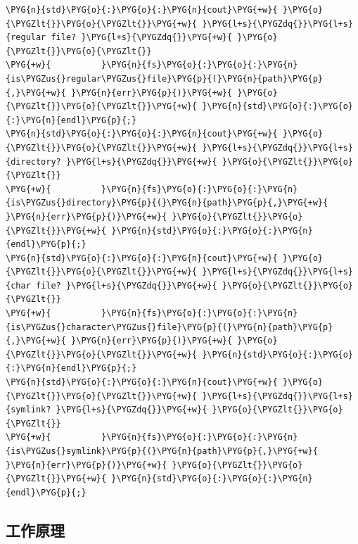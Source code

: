 \begin{itemize}
\begin{codeblockbg}
\begin{Verbatim}[commandchars=\\\{\},breaklines=true,breakanywhere=true,fontsize=\codefont,xleftmargin=17bp]
\PYG{n}{std}\PYG{o}{:}\PYG{o}{:}\PYG{n}{cout}\PYG{+w}{ }\PYG{o}{\PYGZlt{}}\PYG{o}{\PYGZlt{}}\PYG{+w}{ }\PYG{l+s}{\PYGZdq{}}\PYG{l+s}{regular file? }\PYG{l+s}{\PYGZdq{}}\PYG{+w}{ }\PYG{o}{\PYGZlt{}}\PYG{o}{\PYGZlt{}}
\PYG{+w}{          }\PYG{n}{fs}\PYG{o}{:}\PYG{o}{:}\PYG{n}{is\PYGZus{}regular\PYGZus{}file}\PYG{p}{(}\PYG{n}{path}\PYG{p}{,}\PYG{+w}{ }\PYG{n}{err}\PYG{p}{)}\PYG{+w}{ }\PYG{o}{\PYGZlt{}}\PYG{o}{\PYGZlt{}}\PYG{+w}{ }\PYG{n}{std}\PYG{o}{:}\PYG{o}{:}\PYG{n}{endl}\PYG{p}{;}
\PYG{n}{std}\PYG{o}{:}\PYG{o}{:}\PYG{n}{cout}\PYG{+w}{ }\PYG{o}{\PYGZlt{}}\PYG{o}{\PYGZlt{}}\PYG{+w}{ }\PYG{l+s}{\PYGZdq{}}\PYG{l+s}{directory? }\PYG{l+s}{\PYGZdq{}}\PYG{+w}{ }\PYG{o}{\PYGZlt{}}\PYG{o}{\PYGZlt{}}
\PYG{+w}{          }\PYG{n}{fs}\PYG{o}{:}\PYG{o}{:}\PYG{n}{is\PYGZus{}directory}\PYG{p}{(}\PYG{n}{path}\PYG{p}{,}\PYG{+w}{ }\PYG{n}{err}\PYG{p}{)}\PYG{+w}{ }\PYG{o}{\PYGZlt{}}\PYG{o}{\PYGZlt{}}\PYG{+w}{ }\PYG{n}{std}\PYG{o}{:}\PYG{o}{:}\PYG{n}{endl}\PYG{p}{;}
\PYG{n}{std}\PYG{o}{:}\PYG{o}{:}\PYG{n}{cout}\PYG{+w}{ }\PYG{o}{\PYGZlt{}}\PYG{o}{\PYGZlt{}}\PYG{+w}{ }\PYG{l+s}{\PYGZdq{}}\PYG{l+s}{char file? }\PYG{l+s}{\PYGZdq{}}\PYG{+w}{ }\PYG{o}{\PYGZlt{}}\PYG{o}{\PYGZlt{}}
\PYG{+w}{          }\PYG{n}{fs}\PYG{o}{:}\PYG{o}{:}\PYG{n}{is\PYGZus{}character\PYGZus{}file}\PYG{p}{(}\PYG{n}{path}\PYG{p}{,}\PYG{+w}{ }\PYG{n}{err}\PYG{p}{)}\PYG{+w}{ }\PYG{o}{\PYGZlt{}}\PYG{o}{\PYGZlt{}}\PYG{+w}{ }\PYG{n}{std}\PYG{o}{:}\PYG{o}{:}\PYG{n}{endl}\PYG{p}{;}
\PYG{n}{std}\PYG{o}{:}\PYG{o}{:}\PYG{n}{cout}\PYG{+w}{ }\PYG{o}{\PYGZlt{}}\PYG{o}{\PYGZlt{}}\PYG{+w}{ }\PYG{l+s}{\PYGZdq{}}\PYG{l+s}{symlink? }\PYG{l+s}{\PYGZdq{}}\PYG{+w}{ }\PYG{o}{\PYGZlt{}}\PYG{o}{\PYGZlt{}}
\PYG{+w}{          }\PYG{n}{fs}\PYG{o}{:}\PYG{o}{:}\PYG{n}{is\PYGZus{}symlink}\PYG{p}{(}\PYG{n}{path}\PYG{p}{,}\PYG{+w}{ }\PYG{n}{err}\PYG{p}{)}\PYG{+w}{ }\PYG{o}{\PYGZlt{}}\PYG{o}{\PYGZlt{}}\PYG{+w}{ }\PYG{n}{std}\PYG{o}{:}\PYG{o}{:}\PYG{n}{endl}\PYG{p}{;}
\end{Verbatim}
\end{codeblockbg}

\end{itemize}



\subsection{工作原理}


